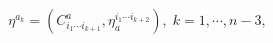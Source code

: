 \begin{equation}
\eta ^{a_{k}}=\left( C_{i_{1}\cdots i_{k+1}}^{a},\eta _{a}^{i_{1}\cdots
i_{k+2}}\right) ,\;k=1,\cdots ,n-3,  \label{f18}
\end{equation}

